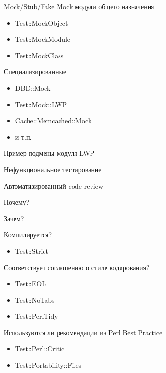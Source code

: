 \documentclass[aspectratio=169]{beamer}
\begin{document}
\begin{frame}{Mock/Stub/Fake}
Mock модули общего назначения
\begin{itemize}
\item Test::MockObject
\item Test::MockModule
\item Test::MockClass
\end{itemize}
Специализированные
\begin{itemize}
\item DBD::Mock
\item Test::Mock::LWP
\item Cache::Memcached::Mock
\item и т.п.
\end{itemize}
\end{frame}

\begin{frame}[allowframebreaks]{Пример подмены модуля LWP}

\end{frame}

\begin{frame}{}
\begin{center}
Нефункциональное тестирование

Автоматизированный code review

Почему?

Зачем?

\end{center}
\end{frame}

\begin{frame}{Компилируется?}
\begin{itemize}
\item Test::Strict
\end{itemize}

\end{frame}

\begin{frame}{Соответствует соглашению о стиле кодирования?}
\begin{itemize}
\item Test::EOL
\item Test::NoTabs
\item Test::PerlTidy
\end{itemize}
\end{frame}

\begin{frame}{Используются ли рекомендации из Perl Best Practice}
\begin{itemize}
\item Test::Perl::Critic
\item Test::Portability::Files
\end{itemize}
\end{frame}
\end{document}
